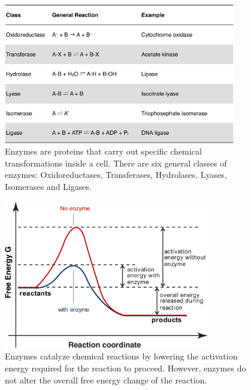 \documentclass[11pt]{article}
\theoremstyle{definition}
\begin{document}
\begin{figure}[!h]\centering
\includegraphics[width=0.9\textwidth]{./figs/Fig-EnzymeTable_v2.pdf}
\caption{Enzymes are proteins that carry out specific chemical transformations inside a cell.
There are six general classes of enzymes: Oxidoreductases, Transferases, Hydrolases, Lyases, Isomerases and Ligases.}\label{fig-enzyme-table}
\end{figure}

\begin{figure}[!h]\centering
\includegraphics[width=0.8\textwidth]{./figs/Fig-ReactionCoordinate_v2.pdf}
\caption{Enzymes catalyze chemical reactions by lowering the activation energy required for the reaction to proceed.
However, enzymes do not alter the overall free energy change of the reaction. }\label{fig-activation-barrier}
\end{figure}
\end{document}

